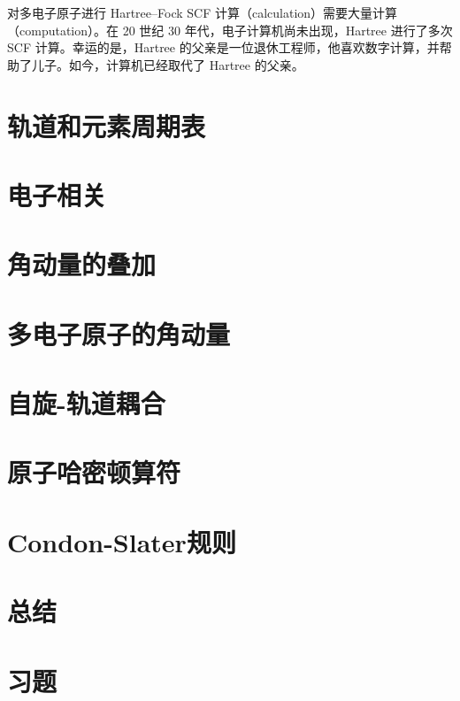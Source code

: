     对多电子原子进行 Hartree–Fock SCF 计算（calculation）需要大量计算（computation）。在 20 世纪 30 年代，电子计算机尚未出现，Hartree 进行了多次 SCF 计算。幸运的是，Hartree 的父亲是一位退休工程师，他喜欢数字计算，并帮助了儿子。如今，计算机已经取代了 Hartree 的父亲。

\section{轨道和元素周期表}
\label{sec:11.2 Orbitals and the Periodic Table}














\section{电子相关}
\label{sec:11.3 Electron Correlation}

\section{角动量的叠加}
\label{sec:11.4 Addition of Angular Momenta}

\section{多电子原子的角动量}
\label{sec:11.5 Angular momentum in Many-Electron Atoms}

\section{自旋-轨道耦合}
\label{sec:11.6 Spin-Orbit Interaction}

\section{原子哈密顿算符}
\label{sec:11.7 The Atomic Hamiltonian}

\section{Condon-Slater规则}
\label{sec:11.8 The Condon-Slater Rules}

\section*{总结}

\section*{习题}
